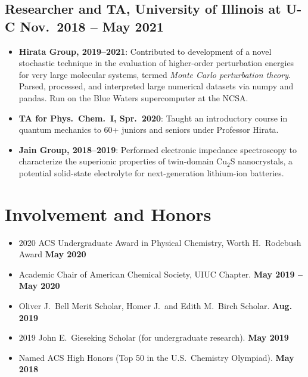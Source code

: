 \documentclass{article}
\begin{document}
\subsection{Researcher and TA, University of Illinois at U-C
            \hfill Nov.\ 2018 -- May 2021}
\begin{itemize}[noitemsep,nolistsep]
	\item \textbf{Hirata Group, 2019--2021}: Contributed to development of a
		novel stochastic technique in the evaluation of higher-order
		perturbation energies for very large molecular systems, termed
		\emph{Monte Carlo perturbation theory}. Parsed, processed, and
		interpreted large numerical datasets via numpy and pandas. Run on the
		Blue Waters supercomputer at the NCSA.

	\item \textbf{TA for Phys.\ Chem.\ I, Spr.\ 2020}: Taught an
		introductory course in quantum mechanics to 60+
		juniors and seniors under Professor Hirata.

	\item \textbf{Jain Group, 2018--2019}: Performed electronic impedance
		spectroscopy to characterize the superionic properties of twin-domain
		Cu$_2$S nanocrystals, a potential solid-state electrolyte for
		next-generation lithium-ion batteries.
\end{itemize}


\section{Involvement and Honors}
\begin{itemize}[noitemsep,nolistsep]
	\item 2020 ACS Undergraduate Award in Physical Chemistry, Worth H.\ Rodebush Award
	\hfill\textbf{May 2020}

	\item Academic Chair of American Chemical Society, UIUC Chapter.
	\hfill\textbf{May 2019 -- May 2020}

	\item Oliver J.\ Bell Merit Scholar, Homer J.\ and Edith M.\ Birch
	Scholar.
	\hfill\textbf{Aug. 2019}

	\item 2019 John E.\ Gieseking Scholar (for undergraduate research).
	\hfill\textbf{May 2019}

	\item Named ACS High Honors (Top 50 in the U.S.\ Chemistry Olympiad).
	\hfill\textbf{May 2018}
\end{itemize}
\end{document}
